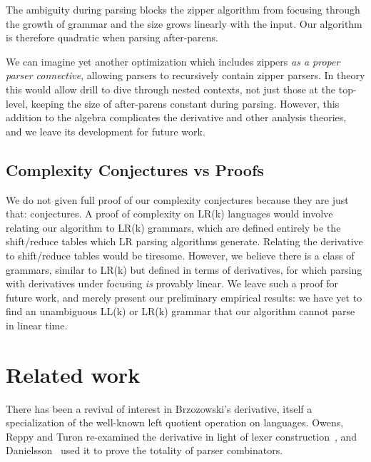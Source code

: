%
The ambiguity during parsing blocks the zipper algorithm from focusing through
the growth of grammar and the size grows linearly with the input.
%
Our algorithm is therefore quadratic when parsing after-parens.

We can imagine yet another optimization which includes zippers \emph{as a
proper parser connective}, allowing parsers to recursively contain zipper
parsers.
%
In theory this would allow drill to dive through nested contexts, not just
those at the top-level, keeping the size of after-parens constant during
parsing.
%
However, this addition to the algebra complicates the derivative and other
analysis theories, and we leave its development for future work.

\subsection{Complexity Conjectures vs Proofs}

We do not given full proof of our complexity conjectures because they are just
that: conjectures.
%
A proof of complexity on LR(k) languages would involve relating our algorithm
to LR(k) grammars, which are defined entirely be the shift/reduce tables which
LR parsing algorithms generate.
%
Relating the derivative to shift/reduce tables would be tiresome.
%
However, we believe there is a class of grammars, similar to LR(k) but defined
in terms of derivatives, for which parsing with derivatives under focusing
\emph{is} provably linear.
%
We leave such a proof for future work, and merely present our preliminary
empirical results: we have yet to find an unambiguous LL(k) or LR(k) grammar
that our algorithm cannot parse in linear time.

\section{Related work}

There has been a revival of interest in Brzozowski's derivative, itself a
specialization of the well-known left quotient operation on languages.
%
Owens, Reppy and Turon re-examined the derivative in light of lexer
construction~\cite{mattmight:Owens:2009:Derivative}, and
Danielsson~\cite{mattmight:Danielsson:2010:Total} used it to prove the totality
of parser combinators.


